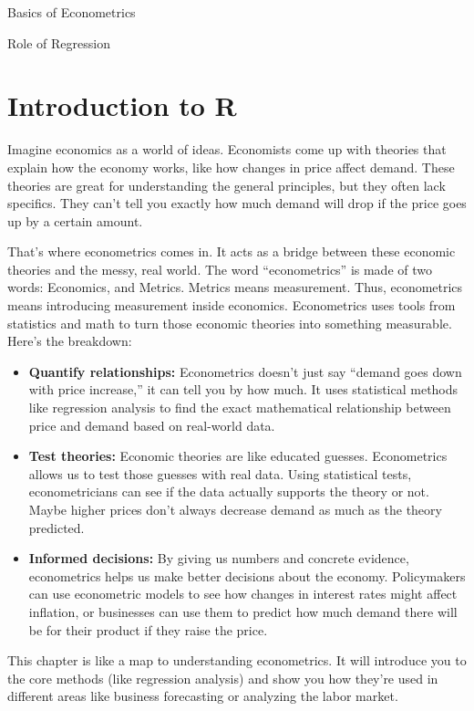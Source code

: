 \documentclass[
  letterpaper,
  paper =a4,
  twoside,
  openright,
  headsepline,
  footsepline,
  listof = totocnumbered,
  chapterprefix = true,
  firstiscover,
  parskip = full*]{scrbook}
\begin{document}
Basics of Econometrics

Role of Regression

\section{Introduction to R}\label{introduction-to-r}

Imagine economics as a world of ideas. Economists come up with theories
that explain how the economy works, like how changes in price affect
demand. These theories are great for understanding the general
principles, but they often lack specifics. They can't tell you exactly
how much demand will drop if the price goes up by a certain amount.

That's where econometrics comes in. It acts as a bridge between these
economic theories and the messy, real world. The word ``econometrics''
is made of two words: Economics, and Metrics. Metrics means measurement.
Thus, econometrics means introducing measurement inside economics.
Econometrics uses tools from statistics and math to turn those economic
theories into something measurable. Here's the breakdown:

\begin{itemize}
\item
  \textbf{Quantify relationships:} Econometrics doesn't just say
  ``demand goes down with price increase,'' it can tell you by how much.
  It uses statistical methods like regression analysis to find the exact
  mathematical relationship between price and demand based on real-world
  data.
\item
  \textbf{Test theories:} Economic theories are like educated guesses.
  Econometrics allows us to test those guesses with real data. Using
  statistical tests, econometricians can see if the data actually
  supports the theory or not. Maybe higher prices don't always decrease
  demand as much as the theory predicted.
\item
  \textbf{Informed decisions:} By giving us numbers and concrete
  evidence, econometrics helps us make better decisions about the
  economy. Policymakers can use econometric models to see how changes in
  interest rates might affect inflation, or businesses can use them to
  predict how much demand there will be for their product if they raise
  the price.
\end{itemize}

This chapter is like a map to understanding econometrics. It will
introduce you to the core methods (like regression analysis) and show
you how they're used in different areas like business forecasting or
analyzing the labor market.
\end{document}
